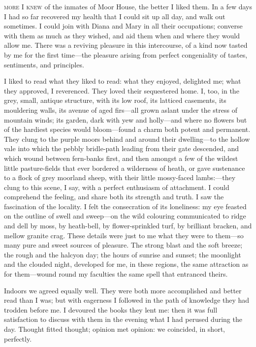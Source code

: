 
 \textsc{more I knew} of the inmates of Moor House, the better I liked them. 
In a few days I had so far recovered my health that I could sit up all
day, and walk out sometimes. I could join with Diana and Mary in all
their occupations; converse with them as much as they wished, and aid
them when and where they would allow me. There was a reviving pleasure
in this intercourse, of a kind now tasted by me for the first time---the
pleasure arising from perfect congeniality of tastes, sentiments, and
principles.

I liked to read what they liked to read: what they enjoyed, delighted
me; what they approved, I reverenced. They loved their sequestered
home. I, too, in the grey, small, antique structure, with its low roof,
its latticed casements, its mouldering walls, its avenue of aged
firs---all grown aslant under the stress of mountain winds; its garden,
dark with yew and holly---and where no flowers but of the hardiest
species would bloom---found a charm both potent and permanent. They
clung to the purple moors behind and around their dwelling---to the
hollow vale into which the pebbly bridle-path leading from their gate
descended, and which wound between fern-banks first, and then amongst a
few of the wildest little pasture-fields that ever bordered a wilderness
of heath, or gave sustenance to a flock of grey moorland sheep, with
their little mossy-faced lambs:---they clung to this scene, I say, with
a perfect enthusiasm of attachment. I could comprehend the feeling, and
share both its strength and truth. I saw the fascination of the
locality. I felt the consecration of its loneliness: my eye feasted on
the outline of swell and sweep---on the wild colouring communicated to
ridge and dell by moss, by heath-bell, by flower-sprinkled turf, by
brilliant bracken, and mellow granite crag. These details were just to
me what they were to them---so many pure and sweet sources of pleasure. 
The strong blast and the soft breeze; the rough and the halcyon day; the
hours of sunrise and sunset; the moonlight and the clouded night,
developed for me, in these regions, the same attraction as for
them---wound round my faculties the same spell that entranced theirs.

Indoors we agreed equally well. They were both more accomplished and
better read than I was; but with eagerness I followed in the path of
knowledge they had trodden before me. I devoured the books they lent
me: then it was full satisfaction to discuss with them in the evening
what I had perused during the day. Thought fitted thought; opinion met
opinion: we coincided, in short, perfectly.

